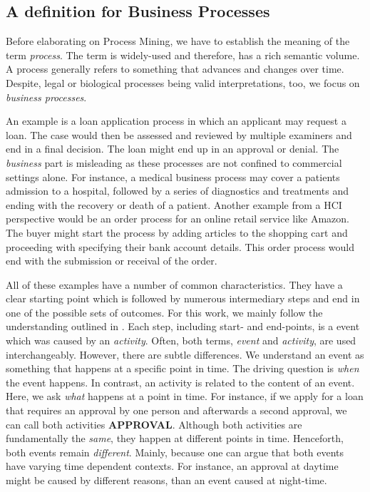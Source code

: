\documentclass[./../../paper.tex]{subfiles}
\begin{document}
\subsection{A definition for Business Processes}
Before elaborating on Process Mining, we have to establish the meaning of the term \emph{process}. The term is widely-used and therefore, has a rich semantic volume. A process generally refers to something that advances and changes over time\autocite{_DefinitionPROCESS_}.
Despite, legal or biological processes being valid interpretations, too, we focus on \emph{business processes}.

An example is a loan application process in which an applicant may request a loan. The case would then be assessed and reviewed by multiple examiners and end in a final decision. The loan might end up in an approval or denial. The \emph{business} part is misleading as these processes are not confined to commercial settings alone. For instance, a medical business process may cover a patients admission to a hospital, followed by a series of diagnostics and treatments and ending with the recovery or death of a patient. Another example from a \gls{HCI} perspective would be an order process for an online retail service like Amazon. The buyer might start the process by adding articles to the shopping cart and proceeding with specifying their bank account details. This order process would end with the submission or receival of the order.

All of these examples have a number of common characteristics. They have a clear starting point which is followed by numerous intermediary steps and end in one of the possible sets of outcomes. For this work, we mainly follow the understanding outlined in \citeauthor{vanderaalst_ProcessMiningManifesto_2012}\autocite{vanderaalst_ProcessMiningManifesto_2012}. Each step, including start- and end-points, is a \gls{event} which was caused by an \emph{activity}. Often, both terms, \emph{event} and \emph{activity}, are used interchangeably. However, there are subtle differences. We understand an event as something that happens at a specific point in time. The driving question is \emph{when} the event happens. In contrast, an activity is related to the content of an event. Here, we ask \emph{what} happens at a point in time. For instance, if we apply for a loan that requires an approval by one person and afterwards a second approval, we can call both activities \textbf{APPROVAL}. Although both activities are fundamentally the \emph{same}, they happen at different points in time. Henceforth, both events remain \emph{different}. Mainly, because one can argue that both events have varying time dependent contexts. For instance, an approval at daytime might be caused by different reasons, than an event caused at night-time.     
\end{document}
